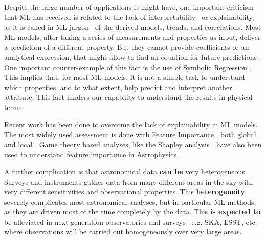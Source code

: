 \documentclass{aa}
\begin{document}
Despite the large number of applications it might have, one important criticism that ML has received is related to the lack of interpretability --or explainability, as it is called in ML jargon-- of the derived models, trends, and correlations. Most ML models, after taking a series of measurements and properties as input, deliver a prediction of a different property. But they cannot provide coefficients or an analytical expression, that might allow to find an equation for future predictions \citep{goebel2018explainable}. One important counter-example of this fact is the use of Symbolic Regression \citep[e.g.][]{2020arXiv200611287C, 2021ApJ...915...71V}. This implies that, for most ML models, it is not a simple task to understand which properties, and to what extent, help predict and interpret another attribute. This fact hinders our capability to understand the results in physical terms.

Recent work has been done to overcome the lack of explainability in ML models. The most widely used assessment is done with Feature Importance \citep{10.1007/978-3-030-10925-7_40, 9007737}, both global and local \citep{Saarela2021}. Game theory based analyses, like the Shapley analysis \citep{Shapley_article}, have also been used to understand feature importance in Astrophysics \citep[e.g.][]{2021MNRAS.507.1468M, 2022MNRAS.515.5285D, 2021Galax...9...86C, 2022MNRAS.509.3441A, 2022MNRAS.516.4716A}. 

A further complication is that astronomical data \textbf{can be} very heterogeneous. 
Surveys and instruments gather data from many different areas in the sky with very different sensitivities and observational properties. This \textbf{heterogeneity} severely complicates most astronomical analyses, but in particular ML methods, as they are driven most of the time completely by the data. This \textbf{is expected to} be alleviated in next-generation observatories and surveys --e.g. SKA, LSST, etc.-- where observations will be carried out homogeneously over very large areas.
\end{document}
